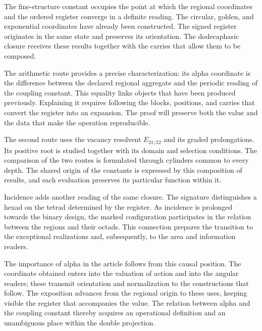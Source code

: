 
The fine-structure constant occupies the point at which the regional
coordinates and the ordered register converge in a definite reading.
The circular, golden, and exponential coordinates have already been
constructed. The signed register originates in the same state and
preserves its orientation. The dodecaphasic closure receives these results
together with the carries that allow them to be composed.

The arithmetic route provides a precise characterization: its alpha
coordinate is the difference between the declared regional aggregate and
the periodic reading of the coupling constant. This equality links objects
that have been produced previously. Explaining it requires following the
blocks, positions, and carries that convert the register into an expansion.
The proof will preserve both the value and the data that make the operation
reproducible.

The second route uses the vacancy resolvent \(E_{21/22}\) and its
graded prolongations. Its positive root is studied together with its domain
and selection conditions. The comparison of the two routes is formulated
through cylinders common to every depth. The shared origin of the constants
is expressed by this composition of results, and each evaluation preserves
its particular function within it.

Incidence adds another reading of the same closure. The signature
distinguishes a hexad on the tetrad determined by the register. As incidence
is prolonged towards the binary design, the marked configuration participates
in the relation between the regions and their octads. This connection
prepares the transition to the exceptional realizations and, subsequently,
to the area and information readers.

The importance of alpha in the article follows from this causal position.
The coordinate obtained enters into the valuation of action and into the
angular readers; these transmit orientation and normalization to the
constructions that follow. The exposition advances from the regional origin
to these uses, keeping visible the register that accompanies the value.
The relation between alpha and the coupling constant thereby acquires an
operational definition and an unambiguous place within the double
projection.
